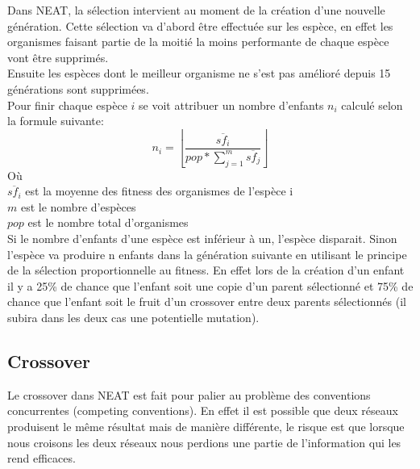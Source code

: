 \documentclass{article}
\begin{document}
Dans NEAT, la sélection intervient au moment de la création d'une nouvelle génération. Cette sélection va d'abord être effectuée sur les espèce, en effet les organismes faisant partie de la moitié la moins performante de chaque espèce vont être supprimés.\\
Ensuite les espèces dont le meilleur organisme ne s'est pas amélioré depuis 15 générations sont supprimées.\\
Pour finir chaque espèce $i$ se voit attribuer un nombre d'enfants $n_i$ calculé selon la formule suivante:
\begin{equation}
	n_i = \left\lfloor\frac{\overline{sf_i}}{pop * \sum^m_{j=1} \overline{sf_j}}\right\rfloor
\end{equation}
Où\\
$\overline{sf_i}$ est la moyenne des fitness des organismes de l'espèce i\\
$m$ est le nombre d'espèces\\
$pop$ est le nombre total d'organismes\\

Si le nombre d'enfants d'une espèce est inférieur à un, l'espèce disparait. Sinon l'espèce va produire n enfants dans la génération suivante en utilisant le principe de la sélection proportionnelle au fitness. En effet lors de la création d'un enfant il y a 25\% de chance que l'enfant soit une copie d'un parent sélectionné et 75\% de chance que l'enfant soit le fruit d'un crossover entre deux parents sélectionnés (il subira dans les deux cas une potentielle mutation).

\subsection{Crossover}

Le crossover dans NEAT est fait pour palier au problème des conventions concurrentes (competing conventions). En effet il est possible que deux réseaux produisent le même résultat mais de manière différente, le risque est que lorsque nous croisons les deux réseaux nous perdions une partie de l'information qui les rend efficaces.
\end{document}
